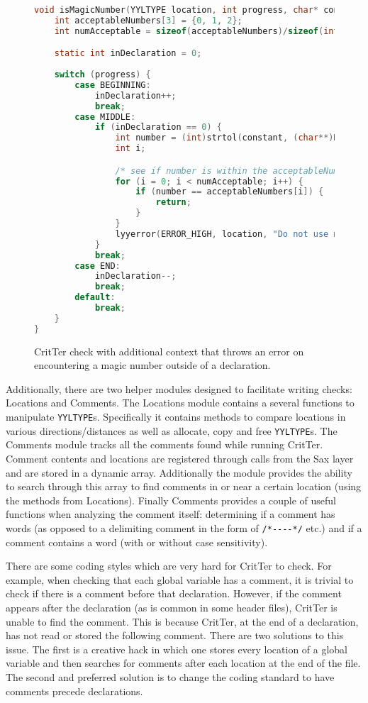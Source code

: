 \documentclass[12pt]{report}
\newcommand{\programName}{CritTer\xspace}
\begin{document}
\begin{figure}
\begin{lstlisting}[language=C]
void isMagicNumber(YYLTYPE location, int progress, char* constant) {
	int acceptableNumbers[3] = {0, 1, 2};
	int numAcceptable = sizeof(acceptableNumbers)/sizeof(int);

	static int inDeclaration = 0;
	
	switch (progress) {
		case BEGINNING:
			inDeclaration++;
			break;
		case MIDDLE:
			if (inDeclaration == 0) {
				int number = (int)strtol(constant, (char**)NULL, 0);
				int i;

				/* see if number is within the acceptableNumbers array */
				for (i = 0; i < numAcceptable; i++) {
					if (number == acceptableNumbers[i]) {
						return;
					}
				}
				lyyerror(ERROR_HIGH, location, "Do not use magic numbers");
			}
			break;
		case END:
			inDeclaration--;
			break;
		default:
			break;
	}
}
\end{lstlisting}
\caption[\programName Check with Additional Context]{\programName check with additional context that throws an error on encountering a magic number outside of a declaration.}
\label{checkWithContext}
\end{figure}

Additionally, there are two helper modules designed to facilitate writing checks: Locations and 
Comments. The Locations module contains a several functions to manipulate \lstinline{YYLTYPE}s.  
Specifically it contains methods to compare locations in various directions/distances as well as 
allocate, copy and free \lstinline{YYLTYPE}s. The Comments module tracks all the comments found 
while running \programName. Comment contents and locations are registered through calls from the 
Sax layer and are stored in a dynamic array. Additionally the module provides the ability to search 
through this array to find comments in or near a certain location (using the methods from Locations). 
Finally Comments provides a couple of useful functions when analyzing the comment itself: 
determining if a comment has words (as opposed to a delimiting comment in the form of 
\lstinline{/*----*/} etc.) and if a comment contains a word (with or without case sensitivity).

There are some coding styles which are very hard for \programName to check. For example, when 
checking that each global variable has a comment, it is trivial to check if there is a comment before that 
declaration. However, if the comment appears after the declaration (as is common in some header 
files), \programName is unable to find the comment. This is because \programName, at the end of a 
declaration, has not read or stored the following comment. There are two solutions to this issue. The 
first is a creative hack in which one stores every location of a global variable and then searches for 
comments after each location at the end of the file. The second and preferred solution is to change the 
coding standard to have comments precede declarations.
\end{document}
